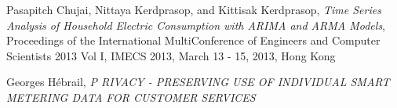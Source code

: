\documentclass[11pt]{article}
\begin{document}

\begin{thebibliography}{9}

  Pasapitch Chujai, Nittaya Kerdprasop, and Kittisak Kerdprasop,
  \textit{Time Series Analysis of Household Electric Consumption with ARIMA and ARMA Models},
  Proceedings of the International MultiConference of Engineers and Computer Scientists 2013 Vol I,
  IMECS 2013, March 13 - 15, 2013, Hong Kong

  Georges Hébrail,
  \textit{P RIVACY - PRESERVING USE OF INDIVIDUAL SMART METERING DATA FOR CUSTOMER SERVICES}

\end{thebibliography}
 
\end{document}
